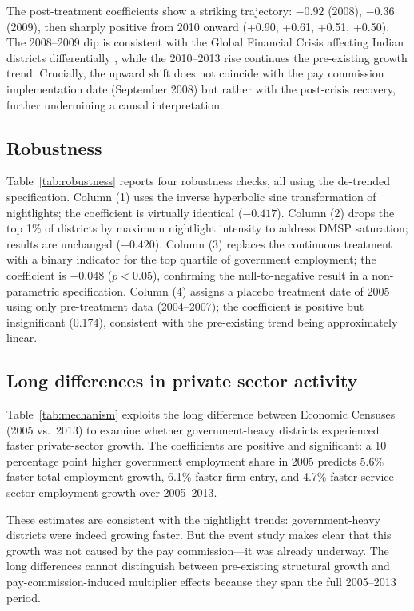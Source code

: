 \documentclass[12pt]{article}
\begin{document}
The post-treatment coefficients show a striking trajectory: $-0.92$ (2008), $-0.36$ (2009), then sharply positive from 2010 onward (+0.90, +0.61, +0.51, +0.50). The 2008--2009 dip is consistent with the Global Financial Crisis affecting Indian districts differentially \citep{RBI2010}, while the 2010--2013 rise continues the pre-existing growth trend. Crucially, the upward shift does not coincide with the pay commission implementation date (September 2008) but rather with the post-crisis recovery, further undermining a causal interpretation.



\subsection{Robustness}

Table~\ref{tab:robustness} reports four robustness checks, all using the de-trended specification. Column (1) uses the inverse hyperbolic sine transformation of nightlights; the coefficient is virtually identical ($-0.417$). Column (2) drops the top 1\% of districts by maximum nightlight intensity to address DMSP saturation; results are unchanged ($-0.420$). Column (3) replaces the continuous treatment with a binary indicator for the top quartile of government employment; the coefficient is $-0.048$ ($p < 0.05$), confirming the null-to-negative result in a non-parametric specification. Column (4) assigns a placebo treatment date of 2005 using only pre-treatment data (2004--2007); the coefficient is positive but insignificant (0.174), consistent with the pre-existing trend being approximately linear.



\subsection{Long differences in private sector activity}

Table~\ref{tab:mechanism} exploits the long difference between Economic Censuses (2005 vs.\ 2013) to examine whether government-heavy districts experienced faster private-sector growth. The coefficients are positive and significant: a 10 percentage point higher government employment share in 2005 predicts 5.6\% faster total employment growth, 6.1\% faster firm entry, and 4.7\% faster service-sector employment growth over 2005--2013.

These estimates are consistent with the nightlight trends: government-heavy districts were indeed growing faster. But the event study makes clear that this growth was not caused by the pay commission---it was already underway. The long differences cannot distinguish between pre-existing structural growth and pay-commission-induced multiplier effects because they span the full 2005--2013 period.
\end{document}
